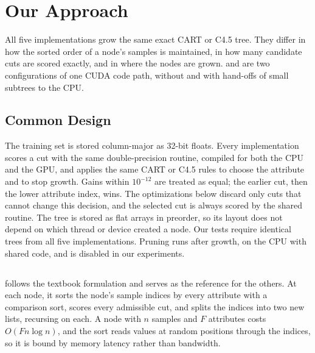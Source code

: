 \section{Our Approach}
\label{sec:impl}

All five implementations grow the same exact CART or C4.5 tree. They differ in how the sorted order of a node's samples is maintained, in how many candidate cuts are scored exactly, and in where the nodes are grown. \ImplGpu{} and \ImplHybrid{} are two configurations of one CUDA code path, without and with hand-offs of small subtrees to the CPU.

\subsection{Common Design}
\label{sec:impl-common}

The training set is stored column-major as 32-bit floats. Every implementation scores a cut with the same double-precision routine, compiled for both the CPU and the GPU, and applies the same CART or C4.5 rules to choose the attribute and to stop growth. Gains within $10^{-12}$ are treated as equal; the earlier cut, then the lower attribute index, wins. The optimizations below discard only cuts that cannot change this decision, and the selected cut is always scored by the shared routine. The tree is stored as flat arrays in preorder, so its layout does not depend on which thread or device created a node. Our tests require identical trees from all five implementations. Pruning runs after growth, on the CPU with shared code, and is disabled in our experiments.

\subsection{\ImplSerialBase}
\label{sec:impl-simple}

\ImplSerialBase{} follows the textbook formulation and serves as the reference for the others. At each node, it sorts the node's sample indices by every attribute with a comparison sort, scores every admissible cut, and splits the indices into two new lists, recursing on each. A node with $n$ samples and $F$ attributes costs $O(Fn\log n)$, and the sort reads values at random positions through the indices, so it is bound by memory latency rather than bandwidth.

\subsection{\ImplSerialOpt}
\label{sec:impl-serial}

